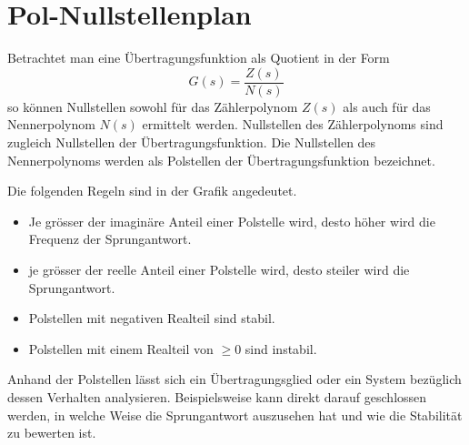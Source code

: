 \section{Pol-Nullstellenplan}
Betrachtet man eine Übertragungsfunktion als Quotient in der Form
\[  
    G(s) = \frac{Z(s)}{N(s)}
\]
so können Nullstellen sowohl für das Zählerpolynom $Z(s)$ als auch 
für das Nennerpolynom $N(s)$ ermittelt werden. Nullstellen des 
Zählerpolynoms sind zugleich Nullstellen der Übertragungsfunktion.
Die Nullstellen des Nennerpolynoms werden als Polstellen der
Übertragungsfunktion bezeichnet.
%
\begin{figure}[h!]
    \centering
\end{figure}
%
Die folgenden Regeln sind in der Grafik angedeutet.
\begin{itemize}
    \item Je grösser der imaginäre Anteil einer Polstelle wird, desto
        höher wird die Frequenz der Sprungantwort.
    \item je grösser der reelle Anteil einer Polstelle wird, desto
        steiler wird die Sprungantwort.
    \item Polstellen mit negativen Realteil sind stabil.
    \item Polstellen mit einem Realteil von $\geq 0$ sind instabil.
\end{itemize}
%
Anhand der Polstellen lässt sich ein Übertragungsglied oder ein System 
bezüglich dessen Verhalten analysieren. Beispielsweise kann direkt darauf
geschlossen werden, in welche Weise die Sprungantwort auszusehen hat und
wie die Stabilität zu bewerten ist.
%
